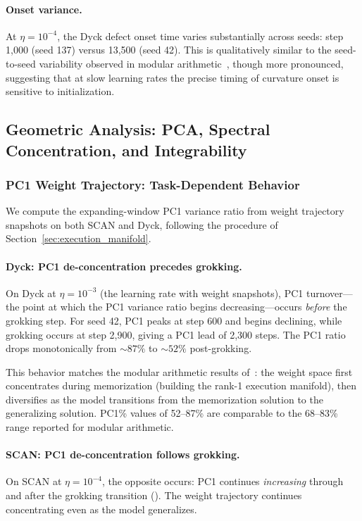\documentclass[11pt]{article}
\begin{document}
\paragraph{Onset variance.}
At $\eta = 10^{-4}$, the Dyck defect onset time varies substantially across seeds: step 1,000 (seed 137) versus 13,500 (seed 42). This is qualitatively similar to the seed-to-seed variability observed in modular arithmetic~\citep{xu2026integrability}, though more pronounced, suggesting that at slow learning rates the precise timing of curvature onset is sensitive to initialization.


\subsection{Geometric Analysis: PCA, Spectral Concentration, and Integrability}
\label{sec:geometry}

\subsubsection{PC1 Weight Trajectory: Task-Dependent Behavior}
\label{sec:pc1}

We compute the expanding-window PC1 variance ratio from weight trajectory snapshots on both SCAN and Dyck, following the procedure of Section~\ref{sec:execution_manifold}.

\paragraph{Dyck: PC1 de-concentration precedes grokking.}
On Dyck at $\eta = 10^{-3}$ (the learning rate with weight snapshots), PC1 turnover---the point at which the PC1 variance ratio begins decreasing---occurs \emph{before} the grokking step. For seed 42, PC1 peaks at step 600 and begins declining, while grokking occurs at step 2,900, giving a PC1 lead of 2,300 steps. The PC1 ratio drops monotonically from ${\sim}87\%$ to ${\sim}52\%$ post-grokking.

This behavior matches the modular arithmetic results of~\citet{xu2026integrability}: the weight space first concentrates during memorization (building the rank-1 execution manifold), then diversifies as the model transitions from the memorization solution to the generalizing solution. PC1\% values of 52--87\% are comparable to the 68--83\% range reported for modular arithmetic.

\paragraph{SCAN: PC1 de-concentration follows grokking.}
On SCAN at $\eta = 10^{-4}$, the opposite occurs: PC1 continues \emph{increasing} through and after the grokking transition (). The weight trajectory continues concentrating even as the model generalizes.
\end{document}
